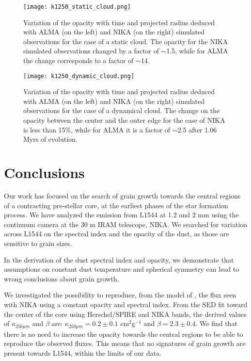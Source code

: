 \documentclass{aa}
\begin{document}
\begin{figure} 
\begin{center}
\texttt{[image: k1250\_static\_cloud.png]}
\end{center}
\caption{Variation of the opacity with time and projected radius deduced with ALMA (on the left) and NIKA (on the right) simulated observations for the case of a static cloud. The opacity for the NIKA simulated observations changed by a factor of $\sim$1.5, while for ALMA the change corresponds to a factor of $\sim$14.}
\label{op_static}
\end{figure}

\begin{figure} 
\begin{center}
\texttt{[image: k1250\_dynamic\_cloud.png]}
\end{center}
\caption{Variation of the opacity with time and projected radius deduced with ALMA (on the left) and NIKA (on the right) simulated observations for the case of a dynamical cloud. The change on the opacity between the center and the outer edge for the case of NIKA is less than 15\%, while for ALMA it is a factor of $\sim$2.5 after 1.06 Myrs of evolution. }
\label{op_dynamic}
\end{figure}


\section{Conclusions} \label{conclusions}


Our work has focused on the search of grain growth towards the central regions of a contracting pre-stellar core, at the earliest phases of the star formation process. We have analyzed the emission from L1544 at 1.2 and 2 mm using the continuum camera at the 30 m IRAM telescope, NIKA. We searched for variation across L1544 on the spectral index and the opacity of the dust, as those are sensitive to grain sizes. 

In the derivation of the dust spectral index and opacity, we demonstrate that assumptions on constant dust temperature and spherical symmetry can lead to wrong conclusions about grain growth. 

We investigated the possibility to reproduce, from the model of , the flux seen with NIKA using a constant opacity and spectral index. From the SED fit toward the center of the core using Herschel/SPIRE and NIKA bands, the derived values of $\kappa_{250 \mu m}$ and $\beta$ are: $\kappa_{250\mu m} = 0.2 \pm 0.1$ cm$^2$g$^{-1}$ and $\beta=2.3 \pm 0.4$. We find that there is no need to increase the opacity towards the central regions to be able to reproduce the observed fluxes. This means that no signatures of grain growth are present towards L1544, within the limits of our data. 
\end{document}
